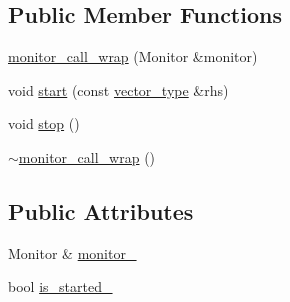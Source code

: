 \subsection*{Public Member Functions}
\begin{DoxyCompactItemize}
\item 
\hyperlink{structnumerical__algos_1_1lin__solvers_1_1detail_1_1monitor__call__wrap_a0da3c9af16dfca032c2c46992cdd84ca}{monitor\-\_\-call\-\_\-wrap} (Monitor \&monitor)
\item 
void \hyperlink{structnumerical__algos_1_1lin__solvers_1_1detail_1_1monitor__call__wrap_a6257cfafad26d1e84dd9327d0475db64}{start} (const \hyperlink{structnumerical__algos_1_1lin__solvers_1_1detail_1_1monitor__call__wrap_a7fc0dd90e41eee6b70e65ac9b4fb5131}{vector\-\_\-type} \&rhs)
\item 
void \hyperlink{structnumerical__algos_1_1lin__solvers_1_1detail_1_1monitor__call__wrap_a18bf518e11456c6e2f1e590eefc5985d}{stop} ()
\item 
\hyperlink{structnumerical__algos_1_1lin__solvers_1_1detail_1_1monitor__call__wrap_a95813cfc2e7ac7eef020f2f01e15d8b1}{$\sim$monitor\-\_\-call\-\_\-wrap} ()
\end{DoxyCompactItemize}
\subsection*{Public Attributes}
\begin{DoxyCompactItemize}
\item 
Monitor \& \hyperlink{structnumerical__algos_1_1lin__solvers_1_1detail_1_1monitor__call__wrap_ac149b5e63f199d521a903a992c1580fa}{monitor\-\_\-}
\item 
bool \hyperlink{structnumerical__algos_1_1lin__solvers_1_1detail_1_1monitor__call__wrap_a93ab759ef23d7dc025db946e9d8750c6}{is\-\_\-started\-\_\-}
\end{DoxyCompactItemize}


